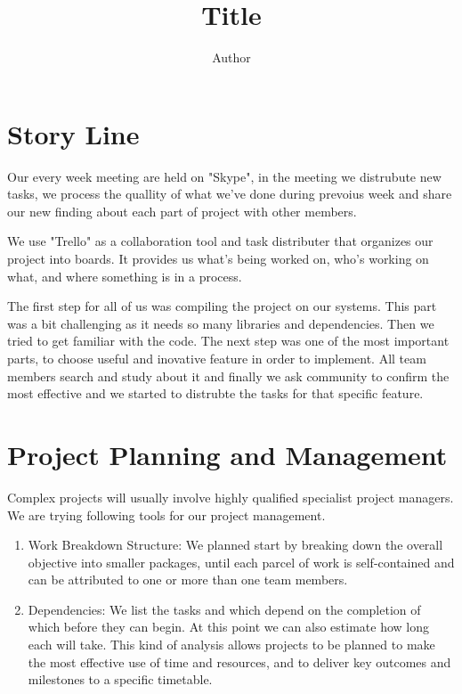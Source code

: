 \documentclass{article}%
\begin{document}
\title{ Title }
\author[]{ Author}
\maketitle


\begin{abstract}

\end{abstract}
\newpage


\section{Story Line}
Our every week meeting are held on "Skype", in the meeting we distrubute new tasks, we process the quallity of what we've done during prevoius week and share our new finding about each part of project with other members.

We use "Trello" as a collaboration tool and task distributer that organizes our project into boards. It provides us what's being worked on, who's working on what, and where something is in a process.

The first step for all of us was compiling the project on our systems. This part was a bit challenging as it needs so many libraries and dependencies. Then we tried to get familiar with the code. The next step was one of the most important parts, to choose useful and inovative feature in order to implement. All team members search and study about it and finally we ask community to confirm the most effective and we started to distrubte the tasks for that specific feature.

\section{Project Planning and Management}
Complex projects will usually involve highly qualified specialist project managers. We are trying following tools for our project management.
\begin{enumerate}
  \item Work Breakdown Structure: 
We planned start by breaking down the overall objective into smaller packages, until each parcel 
of work is self-contained and can be attributed to one or more than one team members.
\item Dependencies: 
We list the tasks and which depend on the completion of which before they can begin. At this 
point we can also estimate how long each will take. 
This kind of analysis allows projects to be planned to make the most effective use of time and 
resources, and to deliver key outcomes and milestones to a specific timetable. 
\end{enumerate}
\end{document}
